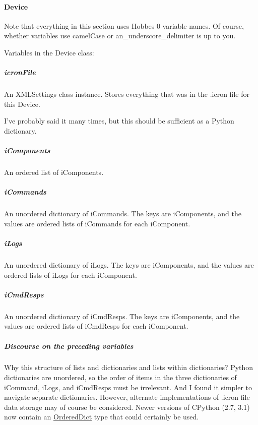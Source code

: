 \documentclass[12pt,letterpaper]{article}
\begin{document}
%
%
\paragraph{Device}
\label{4.3.2.2}

Note that everything in this section uses Hobbes 0 variable names. Of course, whether variables use camelCase or an\_underscore\_delimiter is up to you.

Variables in the Device class:

\setcounter{subparagraph}{-1}



%
%
\subparagraph{icronFile}
\label{4.3.2.2.0}

An XMLSettings class instance. Stores everything that was in the .icron file for this Device.

I've probably said it many times, but this should be sufficient as a Python dictionary.



%
%
\subparagraph{iComponents}
\label{4.3.2.2.1}

An ordered list of iComponents.



%
%
\subparagraph{iCommands}
\label{4.3.2.2.2}

An unordered dictionary of iCommands. The keys are iComponents, and the values are ordered lists of iCommands for each iComponent.



%
%
\subparagraph{iLogs}
\label{4.3.2.2.3}

An unordered dictionary of iLogs. The keys are iComponents, and the values are ordered lists of iLogs for each iComponent.



%
%
\subparagraph{iCmdResps}
\label{4.3.2.2.4}

An unordered dictionary of iCmdResps. The keys are iComponents, and the values are ordered lists of iCmdResps for each iComponent.



%
%
\subparagraph{Discourse on the preceding variables}
\label{4.3.2.2.5}

Why this structure of lists and dictionaries and lists within dictionaries? Python dictionaries are unordered, so the order of items in the three dictionaries of iCommand, iLogs, and iCmdResps must be irrelevant. And I found it simpler to navigate separate dictionaries. However, alternate implementations of .icron file data storage may of course be considered. Newer versions of CPython (2.7, 3.1) now contain an \href{http://docs.python.org/library/collections.html#ordereddict-objects}{OrderedDict} type that could certainly be used.
\end{document}

